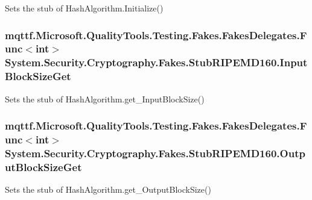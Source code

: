 Sets the stub of Hash\-Algorithm.\-Initialize()

\hypertarget{class_system_1_1_security_1_1_cryptography_1_1_fakes_1_1_stub_r_i_p_e_m_d160_a3bf529e378a468dd7caadd8bcce44462}{
\subsubsection[{Input\-Block\-Size\-Get}]{\setlength{\rightskip}{0pt plus 5cm}mqttf.\-Microsoft.\-Quality\-Tools.\-Testing.\-Fakes.\-Fakes\-Delegates.\-Func$<$int$>$ System.\-Security.\-Cryptography.\-Fakes.\-Stub\-R\-I\-P\-E\-M\-D160.\-Input\-Block\-Size\-Get}}\label{class_system_1_1_security_1_1_cryptography_1_1_fakes_1_1_stub_r_i_p_e_m_d160_a3bf529e378a468dd7caadd8bcce44462}


Sets the stub of Hash\-Algorithm.\-get\-\_\-\-Input\-Block\-Size()

\hypertarget{class_system_1_1_security_1_1_cryptography_1_1_fakes_1_1_stub_r_i_p_e_m_d160_ab880e89e7dcb352d4a06eb3967f47bbd}{
\subsubsection[{Output\-Block\-Size\-Get}]{\setlength{\rightskip}{0pt plus 5cm}mqttf.\-Microsoft.\-Quality\-Tools.\-Testing.\-Fakes.\-Fakes\-Delegates.\-Func$<$int$>$ System.\-Security.\-Cryptography.\-Fakes.\-Stub\-R\-I\-P\-E\-M\-D160.\-Output\-Block\-Size\-Get}}\label{class_system_1_1_security_1_1_cryptography_1_1_fakes_1_1_stub_r_i_p_e_m_d160_ab880e89e7dcb352d4a06eb3967f47bbd}


Sets the stub of Hash\-Algorithm.\-get\-\_\-\-Output\-Block\-Size()



